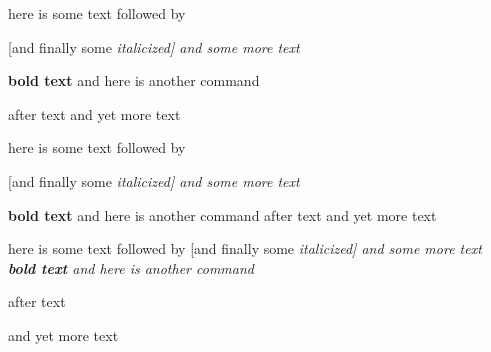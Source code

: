 here is some text followed by                    


[and finally some \itshape{italicized}] and
some more text 


\textbf{bold text} and here is another command 


 after text  and yet more text

here is some text followed by 

[and finally some \itshape{italicized}] and
some more text 



\textbf{bold text} and here is another command  after text  and yet more text

here is some text followed by [and finally some \itshape{italicized}] and
some more text \textbf{bold text} and here is another command 



 after text 



 and yet more text
